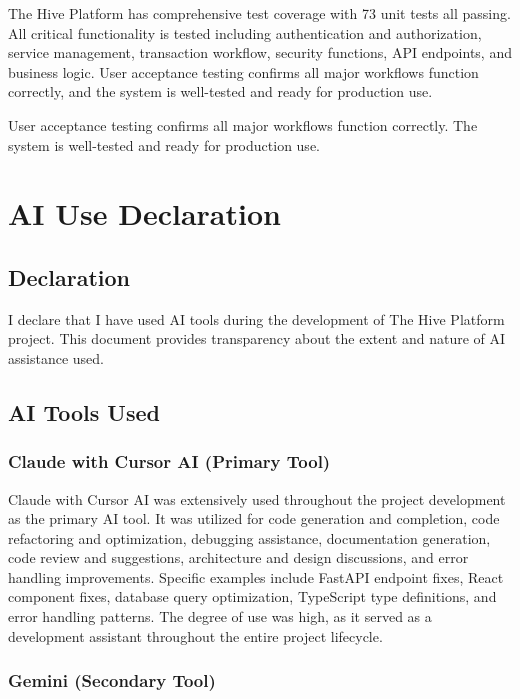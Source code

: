\documentclass[12pt,a4paper]{report}
\begin{document}
The Hive Platform has comprehensive test coverage with 73 unit tests all passing. All critical functionality is tested including authentication and authorization, service management, transaction workflow, security functions, API endpoints, and business logic. User acceptance testing confirms all major workflows function correctly, and the system is well-tested and ready for production use.

User acceptance testing confirms all major workflows function correctly. The system is well-tested and ready for production use.


\chapter{AI Use Declaration}

\section{Declaration}

I declare that I have used AI tools during the development of The Hive Platform project. This document provides transparency about the extent and nature of AI assistance used.

\section{AI Tools Used}

\subsection{Claude with Cursor AI (Primary Tool)}

Claude with Cursor AI was extensively used throughout the project development as the primary AI tool. It was utilized for code generation and completion, code refactoring and optimization, debugging assistance, documentation generation, code review and suggestions, architecture and design discussions, and error handling improvements. Specific examples include FastAPI endpoint fixes, React component fixes, database query optimization, TypeScript type definitions, and error handling patterns. The degree of use was high, as it served as a development assistant throughout the entire project lifecycle.

\subsection{Gemini (Secondary Tool)}
\end{document}
